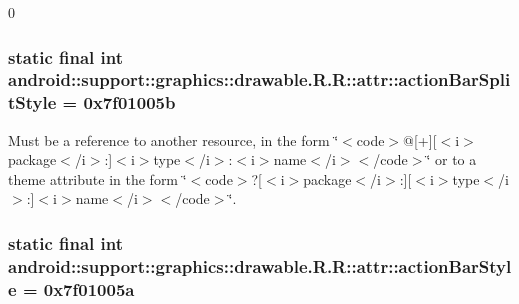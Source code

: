 0\hypertarget{classandroid_1_1support_1_1graphics_1_1drawable_1_1_r_1_1attr_ed3b4d26c95cc35a968ba4241bfef276}{
\subsubsection[{actionBarSplitStyle}]{\setlength{\rightskip}{0pt plus 5cm}static final int android::support::graphics::drawable.R.R::attr::actionBarSplitStyle = 0x7f01005b}}
\label{classandroid_1_1support_1_1graphics_1_1drawable_1_1_r_1_1attr_ed3b4d26c95cc35a968ba4241bfef276}


Must be a reference to another resource, in the form \char`\"{}$<$code$>$@\mbox{[}+\mbox{]}\mbox{[}$<$i$>$package$<$/i$>$:\mbox{]}$<$i$>$type$<$/i$>$:$<$i$>$name$<$/i$>$$<$/code$>$\char`\"{} or to a theme attribute in the form \char`\"{}$<$code$>$?\mbox{[}$<$i$>$package$<$/i$>$:\mbox{]}\mbox{[}$<$i$>$type$<$/i$>$:\mbox{]}$<$i$>$name$<$/i$>$$<$/code$>$\char`\"{}. \hypertarget{classandroid_1_1support_1_1graphics_1_1drawable_1_1_r_1_1attr_65417124703312b1993f018e5de40900}{
\subsubsection[{actionBarStyle}]{\setlength{\rightskip}{0pt plus 5cm}static final int android::support::graphics::drawable.R.R::attr::actionBarStyle = 0x7f01005a}}
\label{classandroid_1_1support_1_1graphics_1_1drawable_1_1_r_1_1attr_65417124703312b1993f018e5de40900}



